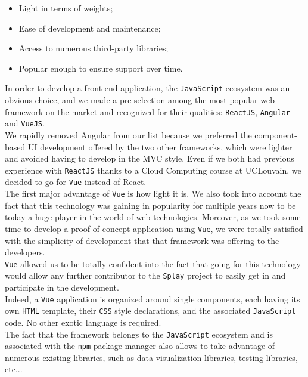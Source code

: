\documentclass{eplmastersthesis}
\begin{document}
        \begin{itemize}
          \item Light in terms of weights;
          \item Ease of development and maintenance;
          \item Access to numerous third-party libraries;
          \item Popular enough to ensure support over time.
        \end{itemize}

        In order to develop a front-end application, the \texttt{JavaScript} ecosystem
        was an obvious choice, and we made a pre-selection among the most
        popular web framework on the market and recognized for their qualities:
        \texttt{ReactJS}, \texttt{Angular} and \texttt{VueJS}.\\
        We rapidly removed Angular from our list because we preferred the
        component-based UI development offered by the two other frameworks,
        which were lighter and avoided having to develop in the MVC style.
        Even if we both had previous experience with \texttt{ReactJS} thanks to a
        Cloud Computing course at UCLouvain, we decided to go for \texttt{Vue}
        instead of React.\\

        The first major advantage of \texttt{Vue} is how light it is. We also took into
        account the fact that this technology was gaining in popularity for
        multiple years now to be today a huge player in the world of web
        technologies. Moreover, as we took some time to develop a proof
        of concept application using \texttt{Vue}, we were totally satisfied with the
        simplicity of development that that framework was offering to the
        developers.\\
        \texttt{Vue} allowed us to be totally confident into the fact
        that going for this technology would allow any further contributor
        to the \texttt{Splay} project to easily get in and participate in the
        development.\\
        Indeed, a \texttt{Vue} application is organized around single components, each
        having its own \texttt{HTML} template, their \texttt{CSS} style declarations, and
        the associated \texttt{JavaScript} code. No other exotic language is required.\\
        The fact that the framework belongs to the \texttt{JavaScript} ecosystem and is
        associated with the \texttt{npm} package manager also allows to take advantage of
        numerous existing libraries, such as data visualization libraries,
        testing libraries, etc...\\
\end{document}
